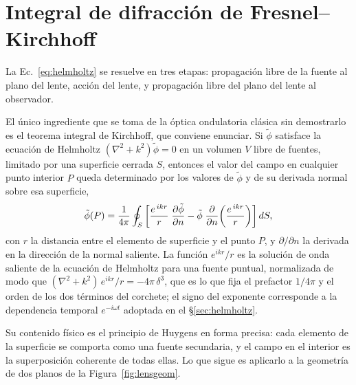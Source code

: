 \documentclass[11pt,a4paper,openany]{book}
\begin{document}
\section{Integral de difracci\'on de Fresnel--Kirchhoff}
\label{ap:fresnel}

La Ec.~\eqref{eq:helmholtz} se resuelve en tres etapas: propagaci\'on libre de
la fuente al plano del lente, acci\'on del lente, y propagaci\'on libre del
plano del lente al observador.

El \'unico ingrediente que se toma de la \'optica ondulatoria cl\'asica sin
demostrarlo es el teorema integral de Kirchhoff, que conviene enunciar. Si
$\tilde\phi$ satisface la ecuaci\'on de Helmholtz
$(\nabla^{2}+k^{2})\tilde\phi=0$ en un volumen $V$ libre de fuentes, limitado
por una superficie cerrada $S$, entonces el valor del campo en cualquier punto
interior $P$ queda determinado por los valores de $\tilde\phi$ y de su
derivada normal sobre esa superficie,
\begin{equation}
  \tilde\phi(P)=\frac{1}{4\pi}\oint_S\left[
  \frac{e^{\,ikr}}{r}\;\pdv{\tilde\phi}{n}
  -\tilde\phi\;\pdv{n}\!\left(\frac{e^{\,ikr}}{r}\right)\right]dS ,
  \label{eq:kirchhoff_theorem}
\end{equation}
con $r$ la distancia entre el elemento de superficie y el punto $P$, y
$\partial/\partial n$ la derivada en la direcci\'on de la normal saliente. La
funci\'on $e^{ikr}/r$ es la soluci\'on de onda saliente de la ecuaci\'on de
Helmholtz para una fuente puntual, normalizada de modo que
$(\nabla^{2}+k^{2})\,e^{ikr}/r=-4\pi\,\delta^{3}$, que es lo que fija el
prefactor $1/4\pi$ y el orden de los dos t\'erminos del corchete; el signo del
exponente corresponde a la dependencia temporal $e^{-i\omega t}$ adoptada en el
\S\ref{sec:helmholtz}.

Su contenido f\'isico es el principio de Huygens en forma precisa: cada
elemento de la superficie se comporta como una fuente secundaria, y el campo en
el interior es la superposici\'on coherente de todas ellas. Lo que sigue es
aplicarlo a la geometr\'ia de dos planos de la Figura~\ref{fig:lensgeom}.
\end{document}
